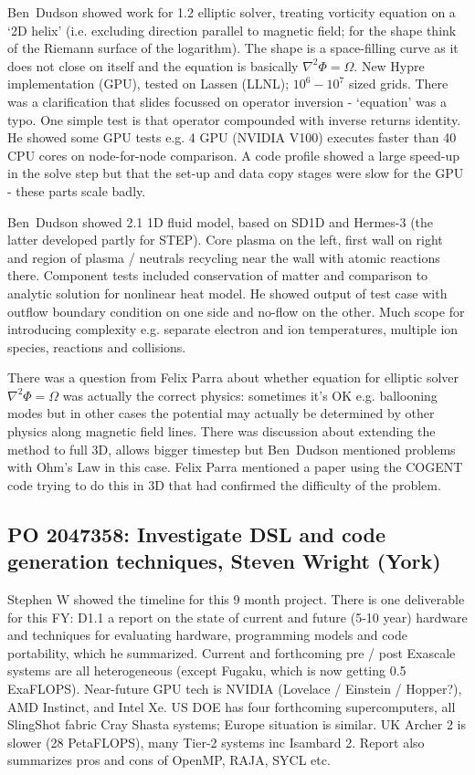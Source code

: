 Ben~Dudson showed work for 1.2 elliptic solver, treating vorticity equation on a `2D 
helix' (i.e. excluding direction parallel to magnetic field; for the shape 
think of the Riemann surface of the logarithm).  The shape is a space-filling 
curve as it does not close on itself and the equation is basically $\nabla^2 
\Phi = \Omega$.  New Hypre implementation (GPU), tested on Lassen (LLNL); $10^6 
- 10^7$ sized grids. There was a clarification that slides focussed on operator inversion - 
`equation' was a typo. One simple test is that operator compounded with  inverse returns 
identity. He showed some GPU tests e.g. 4 GPU (NVIDIA V100) executes faster 
than 40 CPU cores on node-for-node comparison.  A code profile showed a large 
speed-up in the solve step but that the set-up and data copy stages were slow 
for the GPU - these parts scale badly.

Ben~Dudson showed 2.1 1D fluid model, based on SD1D and Hermes-3 (the latter developed partly for
STEP).  Core plasma on the left, first wall on right and region of plasma / 
neutrals recycling near the wall with atomic reactions there.  Component tests 
included conservation of matter and comparison to analytic solution for 
nonlinear heat model.  He showed output of test case with outflow boundary 
condition on one side and no-flow on the other.  Much scope for introducing 
complexity e.g. separate electron and ion temperatures, multiple ion species, 
reactions and collisions.

There was a question from Felix Parra about whether equation for elliptic 
solver $\nabla^2 \Phi = \Omega$ was actually the correct physics: sometimes 
it's OK e.g. ballooning modes but in other cases the potential may actually be 
determined by other physics along magnetic field lines.  There was discussion 
about extending the method to full 3D, allows bigger timestep but Ben~Dudson 
mentioned problems with Ohm's Law in this case.  Felix Parra mentioned a paper 
using the COGENT code trying to do this in 3D that had confirmed the difficulty 
of the problem.

\subsection{PO 2047358: Investigate DSL and code generation techniques, Steven Wright (York)}

Stephen W showed the timeline for this 9 month project.  There is one 
deliverable for this FY: D1.1 a report on the state of current and future (5-10 
year) hardware and techniques for evaluating hardware, programming models and 
code portability, which he summarized.  Current and forthcoming pre / post 
Exascale systems are all heterogeneous (except Fugaku, which is now getting 0.5 
ExaFLOPS).  Near-future GPU tech is NVIDIA (Lovelace / Einstein / Hopper?), AMD 
Instinct, and Intel Xe.  US DOE has four forthcoming supercomputers, all 
SlingShot fabric Cray Shasta systems; Europe situation is similar.  UK Archer 2 
is slower (28 PetaFLOPS), many Tier-2 systems inc Isambard 2.  Report also 
summarizes pros and cons of OpenMP, RAJA, SYCL etc.

